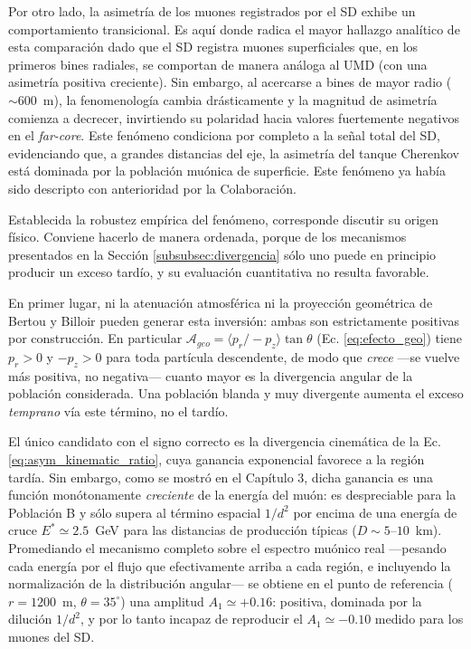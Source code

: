 Por otro lado, la asimetría de los muones registrados por el SD exhibe un comportamiento transicional. Es aquí donde radica el mayor hallazgo analítico de esta comparación dado que el SD registra muones superficiales que, en los primeros bines radiales, se comportan de manera análoga al UMD (con una asimetría positiva creciente). Sin embargo, al acercarse a bines de mayor radio ($\sim 600$~m), la fenomenología cambia drásticamente y la magnitud de asimetría comienza a decrecer, invirtiendo su polaridad hacia valores fuertemente negativos en el \textit{far-core}. Este fenómeno condiciona por completo a la señal total del SD, evidenciando que, a grandes distancias del eje, la asimetría del tanque Cherenkov está dominada por la población muónica de superficie. Este fenómeno ya había sido descripto con anterioridad por la Colaboración.

Establecida la robustez empírica del fenómeno, corresponde discutir su origen físico. Conviene hacerlo de manera ordenada, porque de los mecanismos presentados en la Sección \ref{subsubsec:divergencia} sólo uno puede en principio producir un exceso tardío, y su evaluación cuantitativa no resulta favorable.

En primer lugar, ni la atenuación atmosférica ni la proyección geométrica de Bertou y Billoir pueden generar esta inversión: ambas son estrictamente positivas por construcción. En particular $\mathcal{A}_{geo} = \langle p_r/-p_z\rangle \tan\theta$ (Ec. \ref{eq:efecto_geo}) tiene $p_r > 0$ y $-p_z > 0$ para toda partícula descendente, de modo que \textit{crece} —se vuelve más positiva, no negativa— cuanto mayor es la divergencia angular de la población considerada. Una población blanda y muy divergente aumenta el exceso \textit{temprano} vía este término, no el tardío.

El único candidato con el signo correcto es la divergencia cinemática de la Ec. \ref{eq:asym_kinematic_ratio}, cuya ganancia exponencial favorece a la región tardía. Sin embargo, como se mostró en el Capítulo 3, dicha ganancia es una función monótonamente \textit{creciente} de la energía del muón: es despreciable para la Población B y sólo supera al término espacial $1/d^2$ por encima de una energía de cruce $E^* \simeq 2.5$~GeV para las distancias de producción típicas ($D \sim 5$--$10$~km). Promediando el mecanismo completo sobre el espectro muónico real —pesando cada energía por el flujo que efectivamente arriba a cada región, e incluyendo la normalización de la distribución angular— se obtiene en el punto de referencia ($r = 1200$~m, $\theta = 35^\circ$) una amplitud $A_1 \simeq +0.16$: positiva, dominada por la dilución $1/d^2$, y por lo tanto incapaz de reproducir el $A_1 \simeq -0.10$ medido para los muones del SD.

